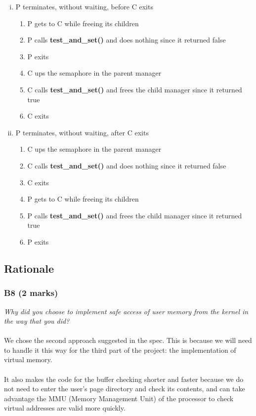 \documentclass{report}
\newcommand{\question}[1]{\textit{#1} \ }
\newcommand{\fun}[1]{\textcolor{Emerald}{\textbf{#1}}}
\begin{document}
\begin{enumerate}[(i)]
                    \item P terminates, without waiting, before C exits
                    \begin{enumerate}
                      \item P gets to C while freeing its children
                      \item P calls \fun{test\_and\_set()} and does nothing since it returned false
                      \item P exits 
                      \item C ups the semaphore in the parent manager
                      \item C calls \fun{test\_and\_set()} and frees the child manager since it returned true
                      \item C exits
                    \end{enumerate}
                    \item P terminates, without waiting, after C exits
                    \begin{enumerate}
                      \item C ups the semaphore in the parent manager
                      \item C calls \fun{test\_and\_set()} and does nothing since it returned false
                      \item C exits
                      \item P gets to C while freeing its children
                      \item P calls \fun{test\_and\_set()} and frees the child manager since it returned true
                      \item P exits
                    \end{enumerate}
                  \end{enumerate}
        
        \subsection*{Rationale}
            \subsubsection*{B8 (2 marks)}
                \question{Why did you choose to implement safe access of user memory from the kernel in the way that you did?}
                                \\
				    			\\ We chose the second approach suggested in the spec. This is because we will need to handle it this way for the third part of the
                                project: the implementation of virtual memory. 
                                \\
                                \\It also makes the code for the buffer checking shorter and faster because we do not need to enter the user's page directory 
                                and check its contents, and can take advantage the MMU (Memory Management Unit) of the processor to check virtual addresses are valid more quickly.
\end{document}
